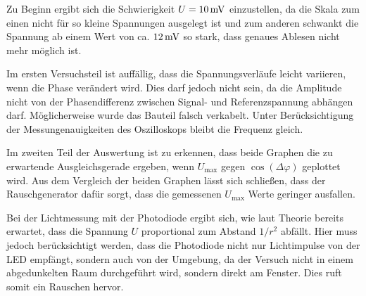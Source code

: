 Zu Beginn ergibt sich die Schwierigkeit  $U = 10 \,\si{\milli\volt}$ einzustellen, da die Skala zum
einen nicht für so kleine Spannungen ausgelegt ist und zum anderen schwankt die
Spannung ab einem Wert von ca. $12 \,\si{\milli\volt}$ so stark, dass genaues Ablesen nicht mehr möglich ist.

Im ersten Versuchsteil ist auffällig, dass die Spannungsverläufe leicht variieren,
wenn die Phase verändert wird. Dies darf jedoch nicht sein, da die Amplitude nicht von
der Phasendifferenz zwischen Signal- und Referenzspannung abhängen darf. Möglicherweise
wurde das Bauteil falsch verkabelt. Unter Berücksichtigung der Messungenauigkeiten des Oszilloskops
bleibt die Frequenz gleich.

Im zweiten Teil der Auswertung ist zu erkennen, dass beide Graphen die zu erwartende
Ausgleichsgerade ergeben, wenn $U_\text{max}$ gegen $\cos{(\Delta\varphi)}$ geplottet wird.
Aus dem Vergleich der beiden Graphen lässt sich schließen, dass der Rauschgenerator
dafür sorgt, dass die gemessenen $U_\text{max}$ Werte geringer ausfallen.

Bei der Lichtmessung mit der Photodiode ergibt sich, wie laut Theorie bereits erwartet,
dass die Spannung $U$ proportional zum Abstand $1/r^2$ abfällt. Hier muss jedoch
berücksichtigt werden, dass die Photodiode nicht nur Lichtimpulse von der LED
empfängt, sondern auch von der Umgebung, da der Versuch nicht in einem
abgedunkelten Raum durchgeführt wird, sondern direkt am Fenster.  Dies ruft somit
ein Rauschen hervor.
